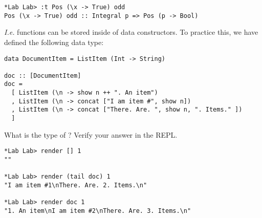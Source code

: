 
\taskLine

\begin{verbatim}
*Lab Lab> :t Pos (\x -> True) odd
Pos (\x -> True) odd :: Integral p => Pos (p -> Bool)
\end{verbatim}
\emph{I.e.} functions can be stored inside of data constructors. To practice this, we have defined the following data type:
\begin{verbatim}
data DocumentItem = ListItem (Int -> String)

doc :: [DocumentItem]
doc = 
  [ ListItem (\n -> show n ++ ". An item")
  , ListItem (\n -> concat ["I am item #", show n])
  , ListItem (\n -> concat ["There. Are. ", show n, ". Items." ])
  ]
\end{verbatim}
What is the type of ? Verify your answer in the REPL.

\begin{verbatim}
*Lab Lab> render [] 1
""

*Lab Lab> render (tail doc) 1
"I am item #1\nThere. Are. 2. Items.\n"

*Lab Lab> render doc 1
"1. An item\nI am item #2\nThere. Are. 3. Items.\n"
\end{verbatim}
